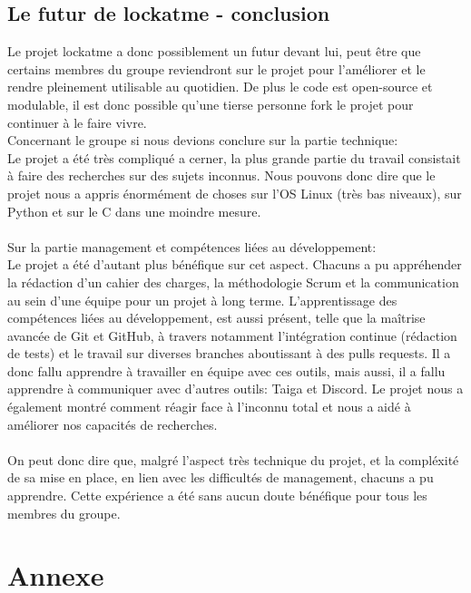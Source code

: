 \documentclass[french]{report}
\begin{document}
\newpage

\section{Le futur de lockatme - conclusion}
Le projet lockatme a donc possiblement un futur devant lui, peut être que certains
membres du groupe reviendront sur le projet pour l'améliorer et le rendre pleinement
utilisable au quotidien. De plus le code est open-source et modulable, il est
donc possible qu'une tierse personne fork le projet pour continuer à le faire vivre.\\

Concernant le groupe si nous devions conclure sur la partie technique:\\
Le projet a été très compliqué a cerner, la plus grande partie du travail consistait
à faire des recherches sur des sujets inconnus. Nous pouvons donc dire que le projet
nous a appris énormément de choses sur l'OS Linux (très bas niveaux), sur Python et sur le C
dans une moindre mesure.
\\\\
Sur la partie management et compétences liées au développement:\\
Le projet a été d'autant plus bénéfique sur cet aspect. Chacuns a pu appréhender
la rédaction d'un cahier des charges, la méthodologie Scrum et la communication
au sein d'une équipe pour un projet à long terme. L'apprentissage des compétences liées
au développement, est aussi présent, telle que la maîtrise avancée de Git et GitHub, à travers notamment
l'intégration continue (rédaction de tests) et le travail sur diverses branches aboutissant à des pulls
requests. Il a donc fallu apprendre à travailler en équipe avec ces outils, mais aussi,
il a fallu apprendre à communiquer avec d'autres outils: Taiga et Discord.
Le projet nous a également montré comment réagir face à l'inconnu total et nous
a aidé à améliorer nos capacités de recherches.
\\\\
On peut donc dire que, malgré l'aspect très technique du projet, et la compléxité
de sa mise en place, en lien avec les difficultés de management, chacuns a pu apprendre.
Cette expérience a été sans aucun doute bénéfique pour tous les membres du groupe.




\chapter*{Annexe}
\end{document}
